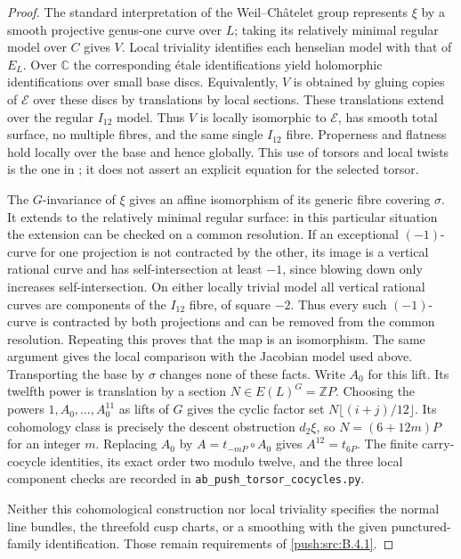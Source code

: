 \begin{proof}
The standard interpretation of the
Weil--Ch\^atelet group represents
$\xi$ by a smooth projective genus-one
curve over $L$; taking its relatively
minimal regular model over $C$ gives
$V$. Local triviality identifies each
henselian model with that of $E_L$.
Over $\mathbb C$ the corresponding
\'etale identifications yield
holomorphic identifications over small
base discs. Equivalently, $V$ is obtained
by gluing copies of $\mathscr E$ over
these discs by translations by local
sections. These translations extend
over the regular $I_{12}$ model.
Thus $V$ is locally isomorphic to
$\mathscr E$, has smooth total surface,
no multiple fibres, and the same single
$I_{12}$ fibre. Properness and flatness
hold locally over the base and hence
globally. This use of torsors and local
twists is the one in
\cite[Sections 3--4]{Xiao91}; it does
not assert an explicit equation for
the selected torsor.

The $G$-invariance of $\xi$ gives an
affine isomorphism of its generic fibre
covering $\sigma$. It extends to the
relatively minimal regular surface:
in this particular situation the
extension can be checked on a common
resolution. If an exceptional
$(-1)$-curve for one projection is not
contracted by the other, its image is
a vertical rational curve and has
self-intersection at least $-1$,
since blowing down only increases
self-intersection. On either locally
trivial model all vertical rational
curves are components of the $I_{12}$
fibre, of square $-2$. Thus every such
$(-1)$-curve is contracted by both
projections and can be removed from
the common resolution. Repeating this
proves that the map is an isomorphism.
The same argument gives the local
comparison with the Jacobian model
used above. Transporting the base by
$\sigma$ changes none of these facts.
Write $A_0$ for this lift. Its twelfth
power is translation by a section
$N\in E(L)^G=\mathbb ZP$.
Choosing the powers $1,A_0,\ldots,A_0^{11}$
as lifts of $G$ gives the cyclic
factor set
$N\lfloor(i+j)/12\rfloor$.
Its cohomology class is precisely the
descent obstruction $d_2\xi$, so
$N=(6+12m)P$ for an integer $m$.
Replacing $A_0$ by $A=t_{-mP}\circ A_0$
gives $A^{12}=t_{6P}$.
The finite carry-cocycle identities,
its exact order two modulo twelve,
and the three local component checks
are recorded in
\texttt{ab\_push\_torsor\_cocycles.py}.

Neither this cohomological construction
nor local triviality specifies the
normal line bundles, the threefold
cusp charts, or a smoothing with the
given punctured-family identification.
Those remain requirements of \ref{push:src:B.4.1}.
\end{proof}

